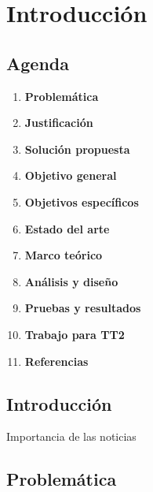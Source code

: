 \chapter{Introducción}



\section{Agenda}

\begin{multicols}{2}

	\begin{enumerate}

		\item \textbf{Problemática}
		\item \textbf{Justificación}
		\item \textbf{Solución propuesta}
		\item \textbf{Objetivo general}
		\item \textbf{Objetivos específicos}
		\item \textbf{Estado del arte}
		\item \textbf{Marco teórico}
		\item \textbf{Análisis y diseño}
		\item \textbf{Pruebas y resultados}
		\item \textbf{Trabajo para TT2}
		\item \textbf{Referencias}

	\end{enumerate}

\end{multicols}


\section{Introducción}

Importancia de las noticias



\section{Problemática}


